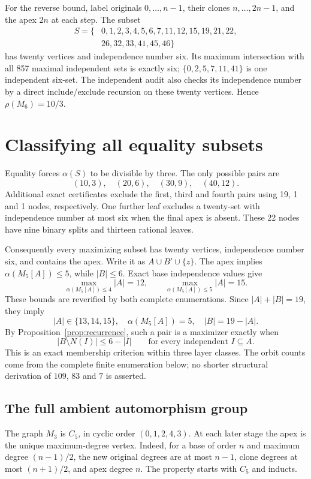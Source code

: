 \documentclass[11pt,letterpaper]{article}
\theoremstyle{remark}
\newcommand{\abs}[1]{\lvert #1\rvert}
\begin{document}
For the reverse bound, label originals $0,\ldots,n-1$, their clones
$n,\ldots,2n-1$, and the apex $2n$ at each step. The subset
\begin{align*}
 S=\{&0,1,2,3,4,5,6,7,11,12,15,19,21,22,\\
     &26,32,33,41,45,46\}
\end{align*}
has twenty vertices and independence number six. Its maximum
intersection with all 857 maximal independent sets is exactly six;
$\{0,2,5,7,11,41\}$ is one independent six-set. The independent audit also
checks its independence number by a direct include/exclude recursion on
these twenty vertices. Hence $\rho(M_6)=10/3$.

\section{Classifying all equality subsets}
Equality forces $\alpha(S)$ to be divisible by three. The only possible
pairs are
\[
 (10,3),\quad(20,6),\quad(30,9),\quad(40,12).
\]
Additional exact certificates
exclude the first, third and fourth pairs using 19, 1 and 1 nodes,
respectively. One further leaf excludes a twenty-set with independence
number at most six when the final apex is absent. These 22 nodes have
nine binary splits and thirteen rational leaves.

Consequently every maximizing subset has twenty vertices, independence
number six, and contains the apex. Write it as $A\cup B'\cup\{z\}$.
The apex implies $\alpha(M_5[A])\le5$, while $\abs B\le6$. Exact base
independence values give
\begin{equation}\label{eq:baseprofile}
 \max_{\alpha(M_5[A])\le4}\abs A=12,\qquad
 \max_{\alpha(M_5[A])\le5}\abs A=15.
\end{equation}
These bounds are reverified by both complete enumerations. Since
$\abs A+\abs B=19$, they imply
\[
 \abs A\in\{13,14,15\},\quad \alpha(M_5[A])=5,
 \quad \abs B=19-\abs A.
\]
By Proposition~\ref{prop:recurrence}, such a pair is a maximizer exactly
when
\begin{equation}\label{eq:family}
 \abs{B\setminus N(I)}\le6-\abs I
 \qquad\text{for every independent }I\subseteq A.
\end{equation}
This is an exact membership criterion within three layer classes. The
orbit counts come from the complete finite enumeration below; no shorter
structural derivation of $109$, $83$ and $7$ is asserted.

\subsection{The full ambient automorphism group}
The graph $M_3$ is $C_5$, in cyclic order $(0,1,2,4,3)$. At each later
stage the apex is the unique maximum-degree vertex. Indeed, for a base
of order $n$ and maximum degree $(n-1)/2$, the new original degrees are
at most $n-1$, clone degrees at most $(n+1)/2$, and apex degree $n$.
The property starts with $C_5$ and inducts.
\end{document}
